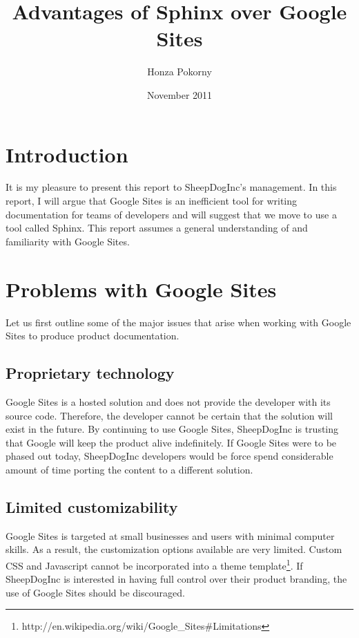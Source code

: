 \documentclass[letterpaper]{report}
\begin{document}
\title{Advantages of Sphinx over Google Sites}
\author{Honza Pokorny}
\date{November 2011}
\maketitle

\section*{Introduction}

    It is my pleasure to present this report to SheepDogInc's management. In
    this report, I will argue that Google Sites is an inefficient tool for
    writing documentation for teams of developers and will suggest that we move
    to use a tool called Sphinx. This report assumes a general understanding of
    and familiarity with Google Sites.

\section*{Problems with Google Sites}

    Let us first outline some of the major issues that arise when working with
    Google Sites to produce product documentation.

    \subsection*{Proprietary technology}

        Google Sites is a hosted solution and does not provide the developer
        with its source code. Therefore, the developer cannot be certain that
        the solution will exist in the future. By continuing to use Google
        Sites, SheepDogInc is trusting that Google will keep the product alive
        indefinitely. If Google Sites were to be phased out today, SheepDogInc
        developers would be force spend considerable amount of time porting the
        content to a different solution.

    \subsection*{Limited customizability}

        Google Sites is targeted at small businesses and users with minimal
        computer skills. As a result, the customization options available are
        very limited. Custom CSS and Javascript cannot be incorporated into a theme
        template\footnote{http://en.wikipedia.org/wiki/Google\_Sites\#Limitations}.
        If SheepDogInc is interested in having full control over their product
        branding, the use of Google Sites should be discouraged.
\end{document}
